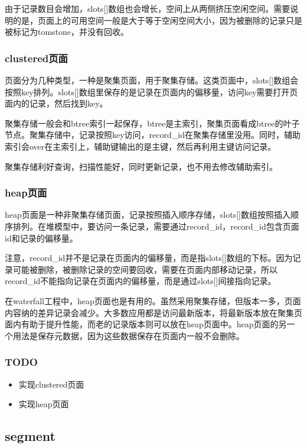 \documentclass{article}
\begin{document}
由于记录数目会增加，slots[]数组也会增长，空间上从两侧挤压空闲空间。需要说明的是，页面上的可用空间一般是大于等于空闲空间大小，因为被删除的记录只是被标记为tomstone，并没有回收。

\subsubsection*{clustered页面}

页面分为几种类型，一种是聚集页面，用于聚集存储。这类页面中，slots[]数组会按照key排列。slots[]数组里保存的是记录在页面内的偏移量，访问key需要打开页面内的记录，然后找到key。

聚集存储一般会和btree索引一起保存，btree是主索引，聚集页面看成btree的叶子节点。聚集存储中，记录按照key访问，record\_id在聚集存储里没用。同时，辅助索引会over在主索引上，辅助键输出的是主键，然后再利用主键访问记录。

聚集存储利好查询，扫描性能好，同时更新记录，也不用去修改辅助索引。

\subsubsection*{heap页面}

heap页面是一种非聚集存储页面，记录按照插入顺序存储，slots[]数组按照插入顺序排列。在堆模型中，要访问一条记录，需要通过record\_id，record\_id包含页面id和记录的偏移量。

注意，record\_id并不是记录在页面内的偏移量，而是指slots[]数组的下标。因为记录可能被删除，被删除记录的空间要回收，需要在页面内部移动记录，所以record\_id不能指向记录在页面内的偏移量，而是通过slots[]间接指向记录。

在waterfall工程中，heap页面也是有用的。虽然采用聚集存储，但版本一多，页面内容纳的差异记录会减少。大多数应用都是访问最新版本，将最新版本放在聚集页面内有助于提升性能，而老的记录版本则可以放在heap页面中。heap页面的另一个用法是保存元数据，因为这些数据保存在页面内一般不会删除。

\subsubsection{TODO}

\begin{itemize}
    \item 实现clustered页面
    \item 实现heap页面
\end{itemize}

\subsection{segment}
\end{document}
